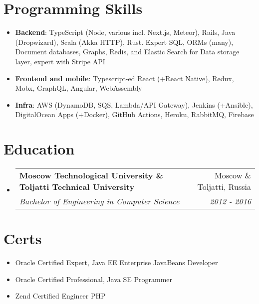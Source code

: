 \documentclass[letterpaper,10pt]{article}
\makeatletter
\newcommand{\resumeItem}[2]{
  \item\small{
    \textbf{#1}{: #2 \vspace{-2pt}}
  }
}
\newcommand{\resumeSubheading}[4]{
  \vspace{-1pt}\item
    \begin{tabular*}{0.97\textwidth}[t]{l@{\extracolsep{\fill}}r}
      \textbf{#1} & #2 \\
      \textit{\small#3} & \textit{\small #4} \\
    \end{tabular*}\vspace{-5pt}
}
\newcommand{\resumeSubItem}[2]{\resumeItem{#1}{#2}\vspace{-4pt}}
\newcommand{\resumeSubHeadingListStart}{\begin{itemize}[leftmargin=*]}
\newcommand{\resumeSubHeadingListEnd}{\end{itemize}}
\makeatother
\begin{document}

%
\section{Programming Skills}
  \resumeSubHeadingListStart
    \item{
      \textbf{Backend}{: TypeScript (Node, various incl. Next.js, Meteor), Rails, Java (Dropwizard), Scala (Akka HTTP), Rust. Expert SQL, ORMs (many), Document databases, Graphs, Redis, and Elastic Search for Data storage layer, expert with Stripe API}
      \hfill
    }
    \item{
      \textbf{Frontend and mobile}{: Typescript-ed React (+React Native), Redux, Mobx, GraphQL, Angular, WebAssembly}
      \hfill
    }
    \item{
      \textbf{Infra}{: AWS (DynamoDB, SQS, Lambda/API Gateway), Jenkins (+Ansible), DigitalOcean Apps (+Docker), GitHub Actions, Heroku, RabbitMQ, Firebase }
      \hfill
    }
  \resumeSubHeadingListEnd

\section{Education}
  \resumeSubHeadingListStart
    \resumeSubheading
      {Moscow Technological University \& Toljatti Technical University}{Moscow \& Toljatti, Russia}
      {Bachelor of Engineering in Computer Science}{2012 - 2016}
  \resumeSubHeadingListEnd

  \section{Certs}
    \resumeSubHeadingListStart
      \item
        {Oracle Certified Expert, Java EE Enterprise JavaBeans Developer}
      \item
        {Oracle Certified Professional, Java SE Programmer}
      \item
        {Zend Certified Engineer PHP}
    \resumeSubHeadingListEnd


\end{document}
